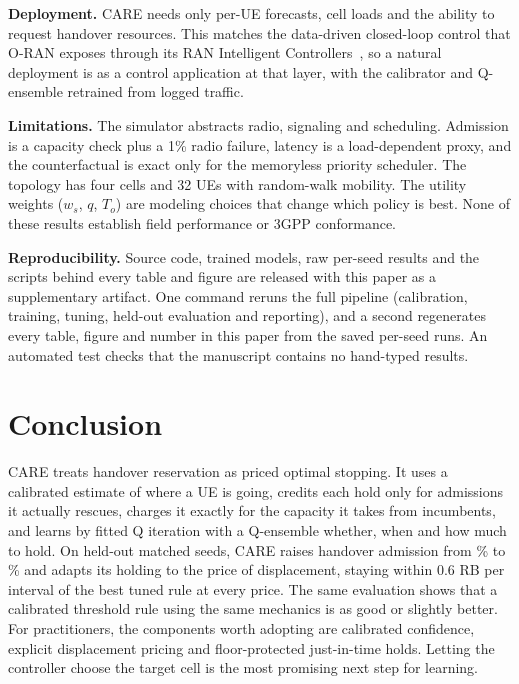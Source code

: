 \documentclass[conference]{IEEEtran}
\begin{document}
\textbf{Deployment.} CARE needs only per-UE forecasts, cell loads and the ability to request handover resources. This matches the data-driven closed-loop control that O-RAN exposes through its RAN Intelligent Controllers~\cite{polese2023oran}, so a natural deployment is as a control application at that layer, with the calibrator and Q-ensemble retrained from logged traffic.

\textbf{Limitations.} The simulator abstracts radio, signaling and scheduling. Admission is a capacity check plus a 1\% radio failure, latency is a load-dependent proxy, and the counterfactual is exact only for the memoryless priority scheduler. The topology has four cells and 32 UEs with random-walk mobility. The utility weights ($w_s$, $q$, $T_o$) are modeling choices that change which policy is best. None of these results establish field performance or 3GPP conformance.

\textbf{Reproducibility.} Source code, trained models, raw per-seed results and the scripts behind every table and figure are released with this paper as a supplementary artifact. One command reruns the full pipeline (calibration, training, tuning, held-out evaluation and reporting), and a second regenerates every table, figure and number in this paper from the saved per-seed runs. An automated test checks that the manuscript contains no hand-typed results.

\section{Conclusion}\label{sec:conclusion}
CARE treats handover reservation as priced optimal stopping. It uses a calibrated estimate of where a UE is going, credits each hold only for admissions it actually rescues, charges it exactly for the capacity it takes from incumbents, and learns by fitted Q iteration with a Q-ensemble whether, when and how much to hold. On held-out matched seeds, CARE raises handover admission from \NoResHSR\% to \CareHSR\% and adapts its holding to the price of displacement, staying within $0.6$ RB per interval of the best tuned rule at every price. The same evaluation shows that a calibrated threshold rule using the same mechanics is as good or slightly better. For practitioners, the components worth adopting are calibrated confidence, explicit displacement pricing and floor-protected just-in-time holds. Letting the controller choose the target cell is the most promising next step for learning.



\end{document}
